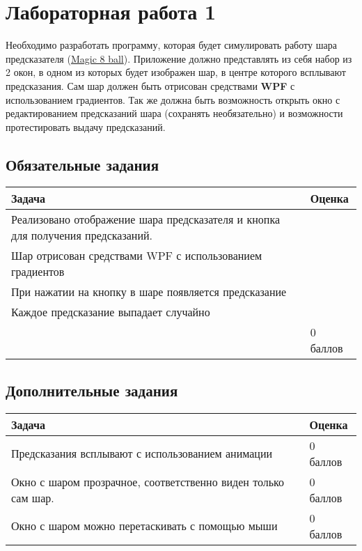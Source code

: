 \documentclass[a4paper, 13pt]{article}
\newcommand{\labstablefraction}{1/10}
\newcommand{\labstablescore}{\textwidth * \labstablefraction}
\newcommand{\labstabletask}{\textwidth * (1 - \labstablefraction) - \labstablescore - 0.83cm}
\begin{document}
\newpage

\setcounter{section}{0}

\section{Лабораторная работа 1}

Необходимо разработать программу, которая будет симулировать работу шара предсказателя (\href{https://ru.wikipedia.org/wiki/Magic_8_ball}{Magic 8 ball}). 
Приложение должно представлять из себя набор из 2 окон, в одном из которых будет изображен шар, в центре которого всплывают предсказания. 
Сам шар должен быть отрисован средствами \textbf{WPF} с использованием градиентов. 
Так же должна быть возможность открыть окно с редактированием предсказаний шара (сохранять необязательно) и возможности протестировать выдачу предсказаний. 

\subsection{Обязательные задания}

\begin{table}[hbt]
\begin{tabular}{|p{\labstabletask}|p{\labstablescore}|}
\hline
Задача & Оценка   \\ \hline
Реализовано отображение шара предсказателя и кнопка для получения предсказаний. & \\ \hline
Шар отрисован средствами WPF с использованием градиентов & \\ \hline
При нажатии на кнопку в шаре появляется предсказание & \\ \hline
Каждое предсказание выпадает случайно & \\ \hline
                                                                                              & 0 баллов \\ \hline
\end{tabular}
\end{table}

\subsection{Дополнительные задания}

\begin{table}[hbt]
\begin{tabular}{|p{\labstabletask}|p{\labstablescore}|}
\hline
Задача & Оценка   \\ \hline
Предсказания всплывают с использованием анимации & 0 баллов \\ \hline
Окно с шаром прозрачное, соответственно виден только сам шар. & 0 баллов \\ \hline
Окно с шаром можно перетаскивать с помощью мыши & 0 баллов \\ \hline
\end{tabular}
\end{table}
\end{document}
